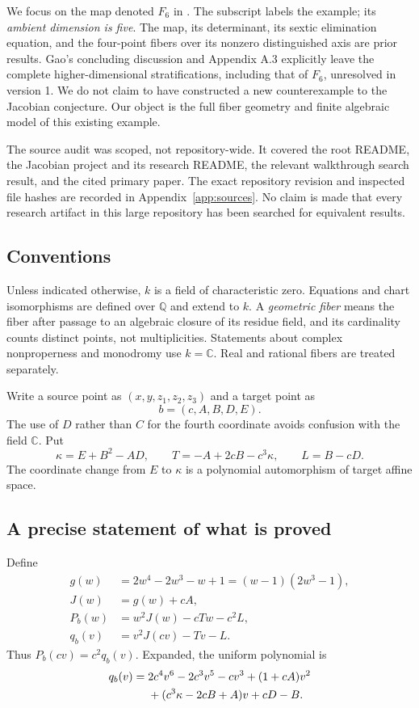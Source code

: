 \documentclass[11pt,a4paper]{article}
\theoremstyle{definition}
\newcommand{\C}{\mathbb C}
\newcommand{\Q}{\mathbb Q}
\newcommand{\kk}{\kappa}
\begin{document}
We focus on the map denoted $F_6$ in \cite[\S4.5.1, Theorem 4.5]{Gao}.
The subscript labels the example; its \emph{ambient dimension is five}.
The map, its determinant, its sextic elimination equation, and the
four-point fibers over its nonzero distinguished axis are prior results.
Gao's concluding discussion and Appendix A.3 explicitly leave the
complete higher-dimensional stratifications, including that of $F_6$,
unresolved in version 1. We do not claim to have constructed a new
counterexample to the Jacobian conjecture. Our object is the full fiber
geometry and finite algebraic model of this existing example.

The source audit was scoped, not repository-wide. It covered the root
README, the Jacobian project and its research README, the relevant
walkthrough search result, and the cited primary paper. The exact
repository revision and inspected file hashes are recorded in
Appendix~\ref{app:sources}. No claim is made that every research artifact
in this large repository has been searched for equivalent results.

\subsection{Conventions}
Unless indicated otherwise, $k$ is a field of characteristic zero. Equations
and chart isomorphisms are defined over $\Q$ and extend to $k$. A
\emph{geometric fiber} means the fiber after passage to an algebraic
closure of its residue field, and its cardinality counts distinct points,
not multiplicities. Statements about complex nonproperness and monodromy
use $k=\C$. Real and rational fibers are treated separately.

Write a source point as $(x,y,z_1,z_2,z_3)$ and a target point as
\[
 b=(c,A,B,D,E).
\]
The use of $D$ rather than $C$ for the fourth coordinate avoids confusion
with the field $\C$. Put
\begin{equation}\label{eq:TL}
 \kk=E+B^2-AD,\qquad T=-A+2cB-c^3\kk,\qquad L=B-cD.
\end{equation}
The coordinate change from $E$ to $\kk$ is a polynomial automorphism of
target affine space.

\subsection{A precise statement of what is proved}
Define
\begin{align}
 g(w)&=2w^4-2w^3-w+1=(w-1)(2w^3-1),\label{eq:g}\\
 J(w)&=g(w)+cA,\label{eq:J}\\
 P_b(w)&=w^2J(w)-cTw-c^2L,\label{eq:P}\\
 q_b(v)&=v^2J(cv)-Tv-L.\label{eq:qcompact}
\end{align}
Thus $P_b(cv)=c^2q_b(v)$. Expanded, the uniform polynomial is
\begin{align}
 q_b(v)={}&2c^4v^6-2c^3v^5-cv^3+(1+cA)v^2\notag\\
 &+(c^3\kk-2cB+A)v+cD-B.\label{eq:q}
\end{align}
\end{document}
